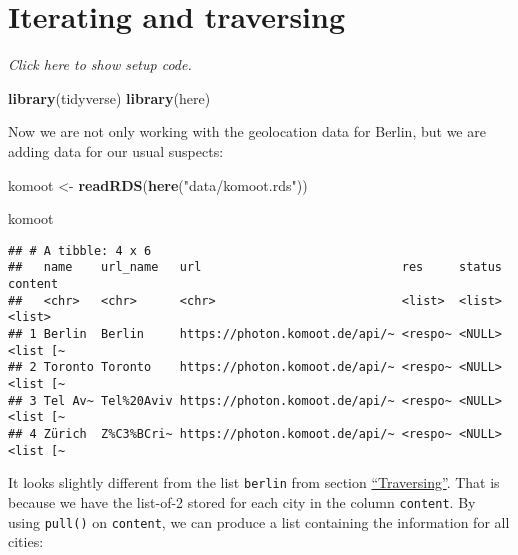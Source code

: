 \documentclass[]{book}
\newenvironment{Shaded}{\begin{snugshade}}{\end{snugshade}}
\newcommand{\DecValTok}[1]{\textcolor[rgb]{0.00,0.00,0.81}{#1}}
\newcommand{\KeywordTok}[1]{\textcolor[rgb]{0.13,0.29,0.53}{\textbf{#1}}}
\newcommand{\NormalTok}[1]{#1}
\newcommand{\OperatorTok}[1]{\textcolor[rgb]{0.81,0.36,0.00}{\textbf{#1}}}
\newcommand{\StringTok}[1]{\textcolor[rgb]{0.31,0.60,0.02}{#1}}
\begin{document}
\hypertarget{komoot}{%
\section{Iterating and traversing}\label{komoot}}

\emph{Click here to show setup code.}

\begin{Shaded}
\begin{Highlighting}[]
\KeywordTok{library}\NormalTok{(tidyverse)}
\KeywordTok{library}\NormalTok{(here)}
\end{Highlighting}
\end{Shaded}

Now we are not only working with the geolocation data for Berlin, but we are adding data for our usual suspects:

\begin{Shaded}
\begin{Highlighting}[]
\NormalTok{komoot <-}\StringTok{ }\KeywordTok{readRDS}\NormalTok{(}\KeywordTok{here}\NormalTok{(}\StringTok{"data/komoot.rds"}\NormalTok{))}

\NormalTok{komoot}
\end{Highlighting}
\end{Shaded}

\begin{verbatim}
## # A tibble: 4 x 6
##   name    url_name   url                            res     status content 
##   <chr>   <chr>      <chr>                          <list>  <list> <list>  
## 1 Berlin  Berlin     https://photon.komoot.de/api/~ <respo~ <NULL> <list [~
## 2 Toronto Toronto    https://photon.komoot.de/api/~ <respo~ <NULL> <list [~
## 3 Tel Av~ Tel%20Aviv https://photon.komoot.de/api/~ <respo~ <NULL> <list [~
## 4 Zürich  Z%C3%BCri~ https://photon.komoot.de/api/~ <respo~ <NULL> <list [~
\end{verbatim}

It looks slightly different from the list \texttt{berlin} from section \protect\hyperlink{berlin}{``Traversing''}.
That is because we have the list-of-2 stored for each city in the column \texttt{content}.
By using \texttt{pull()} on \texttt{content}, we can produce a list containing the information for all cities:

\begin{Shaded}
\end{Shaded}
\end{document}
